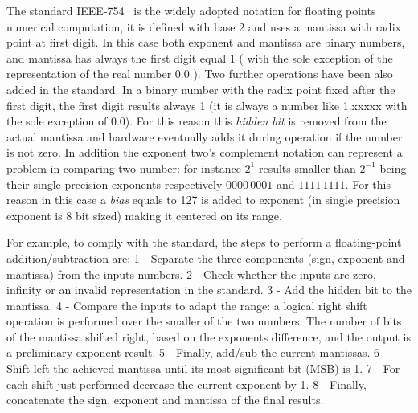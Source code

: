 The standard IEEE-754~\cite{1985--ieee754} is the widely adopted notation for floating points numerical computation, it is defined with base 2 and uses a mantissa with radix point at first digit. In this case both exponent and mantissa are binary numbers, and mantissa has always the first digit equal 1 ( with the sole exception of the representation of the real number 0.0 ). 
Two further operations have been also added in the standard. In a binary number with the radix point fixed after the first digit, the first digit results always 1 (it is always a number like 1.xxxxx with the sole exception of 0.0). For this reason this \textit{hidden bit} is removed from the actual mantissa and hardware eventually adds it during operation if the number is not zero.
In addition the exponent two's complement notation can represent a problem in comparing two number: for instance $2^1$ results smaller than $2^{-1}$ being their single precision exponents respectively $0000\,0001$ and $1111\,1111$. For this reason in this case a \textit{bias} equals to 127 is added to exponent (in single precision exponent is 8 bit sized) making it centered on its range.

For example, to comply with the standard, the steps to perform a floating-point addition/subtraction are: 
1 - Separate the three components (sign, exponent and mantissa) from the inputs numbers.
2 - Check whether the inputs are zero, infinity or an invalid representation in the standard. 
3 - Add the hidden bit to the mantissa.
4 - Compare the inputs to adapt the range: a logical right shift operation is performed over the smaller of the two numbers. The number of bits of the mantissa shifted right, based on the exponents difference, and the output is a preliminary exponent result. 
5 - Finally, add/sub the current mantissas.
6 - Shift left the achieved mantissa until its most significant bit (MSB) is 1. 
7 - For each shift just performed decrease the current exponent by 1. 
8 - Finally, concatenate the sign, exponent and mantissa of the final results.



